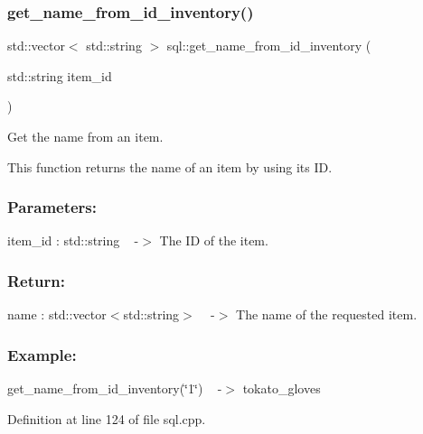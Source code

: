 \subsubsection{\texorpdfstring{get\+\_\+name\+\_\+from\+\_\+id\+\_\+inventory()}{get\_name\_from\_id\_inventory()}}
{\footnotesize\ttfamily std\+::vector$<$ std\+::string $>$ sql\+::get\+\_\+name\+\_\+from\+\_\+id\+\_\+inventory (\begin{DoxyParamCaption}\item[{std\+::string}]{item\+\_\+id }\end{DoxyParamCaption})}



Get the name from an item. 

This function returns the name of an item by using its ID.~\newline


\subsubsection*{Parameters\+: }

item\+\_\+id \+: std\+::string ~\newline
-\/$>$ The ID of the item. ~\newline


\subsubsection*{Return\+: }

name \+: std\+::vector$<$std\+::string$>$ ~\newline
-\/$>$ The name of the requested item.

\subsubsection*{Example\+: }

get\+\_\+name\+\_\+from\+\_\+id\+\_\+inventory(\char`\"{}1\char`\"{}) ~\newline
-\/$>$ tokato\+\_\+gloves 

Definition at line 124 of file sql.\+cpp.

